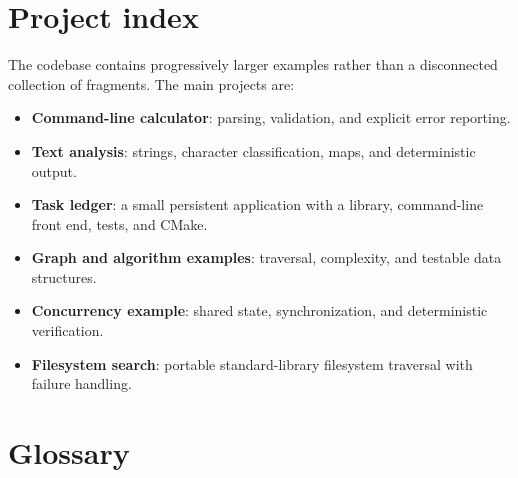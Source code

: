 \chapter*{Project index}

The codebase contains progressively larger examples rather than a disconnected collection of fragments. The main projects are:

\begin{itemize}
\item \textbf{Command-line calculator}: parsing, validation, and explicit error reporting.
\item \textbf{Text analysis}: strings, character classification, maps, and deterministic output.
\item \textbf{Task ledger}: a small persistent application with a library, command-line front end, tests, and CMake.
\item \textbf{Graph and algorithm examples}: traversal, complexity, and testable data structures.
\item \textbf{Concurrency example}: shared state, synchronization, and deterministic verification.
\item \textbf{Filesystem search}: portable standard-library filesystem traversal with failure handling.
\end{itemize}

\chapter*{Glossary}

